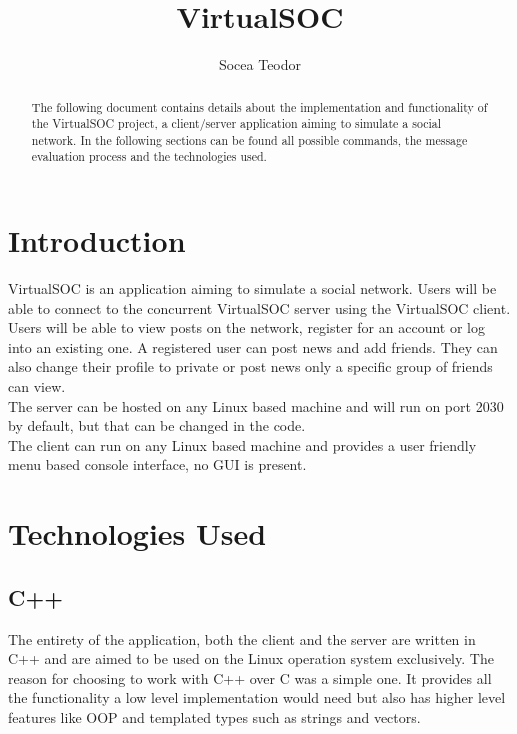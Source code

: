 \documentclass[runningheads, a4paper]{llncs}
\begin{document}
\title{VirtualSOC}


\author{Socea Teodor}



\maketitle

\begin{abstract}
The following document contains details about the implementation and functionality of the VirtualSOC project, a client/server application aiming to simulate a social network. In the following sections can be found all possible commands, the message evaluation process and the technologies used.

\end{abstract}

\section{Introduction}
VirtualSOC is an application aiming to simulate a social network. Users will be able to connect to the concurrent VirtualSOC server using the VirtualSOC client. Users will be able to view posts on the network, register for an account or log into an existing one. A registered user can post news and add friends. They can also change their profile to private or post news only a specific group of friends can view.\\
The server can be hosted on any Linux based machine and will run on port 2030 by default, but that can be changed in the code.\\
The client can run on any Linux based machine and provides a user friendly menu based console interface, no GUI is present.

\section{Technologies Used}
\subsection{C++}
The entirety of the application, both the client and the server are written in C++ and are aimed to be used on the Linux operation system exclusively. The reason for choosing to work with C++ over C was a simple one. It provides all the functionality a low level implementation would need but also has higher level features like OOP and templated types such as strings and vectors.
\end{document}
